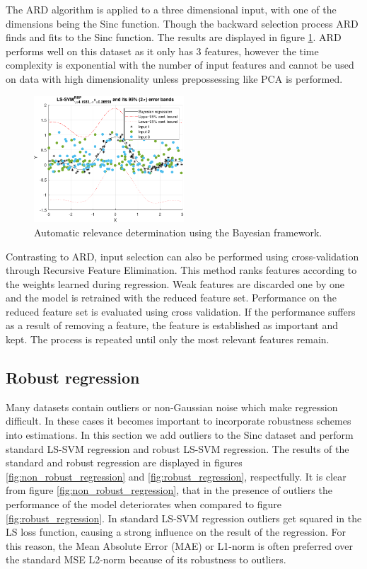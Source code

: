 \documentclass{article}
\begin{document}
        The ARD algorithm is applied to a three dimensional input, with one of the dimensions being the Sinc function. Though the backward selection process ARD finds and fits to the Sinc function. The results are displayed in figure \ref{fig:bayesianregression_ard}. ARD performs well on this dataset as it only has 3 features, however the time complexity is exponential with  the number of input features and cannot be used on data with high dimensionality unless prepossessing like PCA is performed. 
        
        \begin{figure}[h]
             \centering
             \includegraphics[width=0.5\textwidth]{Assignment 2/figures/1_3/bayesian_regression.pdf}
            \caption{Automatic relevance determination using the Bayesian framework.}
            \label{fig:bayesianregression_ard}
        \end{figure}
        
        Contrasting to ARD, input selection can also be performed using cross-validation through Recursive Feature Elimination. This method ranks features according to the weights learned during regression. Weak features are discarded one by one and the model is retrained with the reduced feature set. Performance on the reduced feature set is evaluated using cross validation. If the performance suffers as a result of removing a feature, the feature is established as important and kept. The process is repeated until only the most relevant features remain. 
            
            
    \subsection{Robust regression}
        Many datasets contain outliers or non-Gaussian noise which make regression difficult. In these cases it becomes important to incorporate robustness schemes into estimations. In this section we add outliers to the Sinc dataset and perform standard LS-SVM regression and robust LS-SVM regression. The results of the standard and robust regression are displayed in figures \ref{fig:non_robust_regression} and \ref{fig:robust_regression}, respectfully. It is clear from figure \ref{fig:non_robust_regression}, that in the presence of outliers the performance of the model deteriorates when compared to figure \ref{fig:robust_regression}. In standard LS-SVM regression outliers get squared in the LS loss function, causing a strong influence on the result of the regression. For this reason, the Mean Absolute Error (MAE) or L1-norm is often preferred over the standard MSE L2-norm because of its robustness to outliers.   
        
\end{document}
